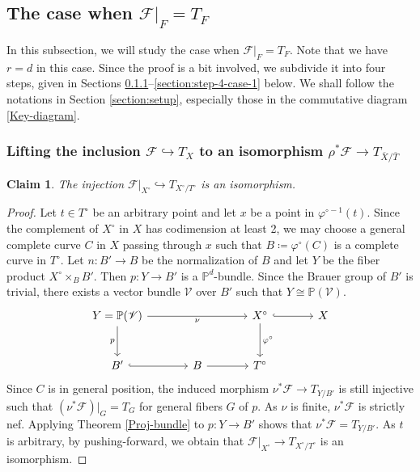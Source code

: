 \documentclass[english,reqno]{amsart}
\newcommand\bbP{{\mathbb P}}
\newcommand\sF{{\mathscr F}}
\newcommand\sV{{\mathscr V}}
\theoremstyle{plain}
\newtheorem{claim}[thm]{Claim}
\theoremstyle{definition}
\numberwithin{equation}{section} %
\begin{document}
\subsection{The case when $\sF|_F=T_F$}
\label{subsection:F=T_F}

In this subsection, we will  study the case when $\sF\vert_F=T_F$.  Note that we have $r=d$ in this case. Since the proof   is a bit involved, we  subdivide  it into four steps, given in Sections \ref{section:step-1-case-1}--\ref{section:step-4-case-1} below. We shall follow the notations  in Section \ref{section:setup}, especially those in the commutative diagram \eqref{Key-diagram}.

\subsubsection{Lifting the inclusion $\sF\hookrightarrow T_X$ to an isomorphism $\rho^*\sF\rightarrow T_{\overline{X}/\overline{T}}$}
\label{section:step-1-case-1}

\begin{claim}\label{claim:pullback-sheaf=relative-tangent}
	The injection $\sF|_{X^\circ} \hookrightarrow T_{X^\circ/T^\circ}$ is an isomorphism.
\end{claim}


\begin{proof}
	Let $t\in T^\circ$ be an arbitrary point and let $x$ be a point in $\varphi^{\circ-1}(t)$. Since the complement of $X^\circ$ in $X$ has codimension at least 2, we may choose a general complete curve $C$ in $X$ passing through $x$ such that $B\coloneqq\varphi^\circ(C)$ is a complete curve in $T^\circ$. Let $n\colon B'\rightarrow B$ be the normalization of $B$ and let $Y$ be the fiber product $X^\circ\times_{B} B'$. Then $p\colon Y\rightarrow B'$ is a $\bbP^d$-bundle. Since the Brauer group of $B'$ is trivial, there exists a vector bundle $\sV$ over $B'$ such that $Y\cong \bbP(\sV)$.
	\[\begin{tikzcd}[column sep=large, row sep=large]
	Y=\bbP(\sV) \dar[swap]{p}   \arrow{rr}[swap]{\nu}     &      &  X^\circ\dar{\varphi^\circ}  \arrow[r,hookrightarrow] & X\\
	B'  \arrow[r,hookrightarrow]        &    B  \rar    & T^\circ &
	\end{tikzcd}\]
	Since $C$ is in general position, the induced morphism $\nu^*\sF\rightarrow T_{Y/B'}$ is still injective such that $(\nu^*\sF)\vert_G=T_G$ for general fibers $G$ of $p$. As $\nu$ is finite, $\nu^*\sF$ is strictly nef. Applying Theorem \ref{Proj-bundle} to $p\colon Y\rightarrow B'$ shows that $\nu^*\sF=T_{Y/B'}$. As $t$ is arbitrary, by pushing-forward, we obtain that $\sF\vert_{X^\circ}\rightarrow T_{X^\circ/T^\circ}$ is an isomorphism.
\end{proof}
\end{document}
